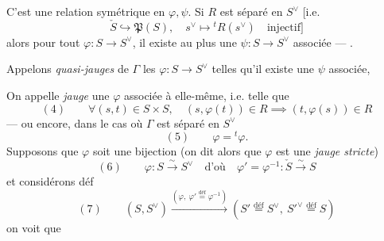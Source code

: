 \documentclass[11pt,a4paper]{article}
\begin{document}
C'est une relation symétrique en $\varphi, \psi$. Si $R$ est séparé en $S^{\vee}$ [i.e.
\[
\check{S} \hookrightarrow \mathfrak{P}(S), \quad s^{\vee} \mapsto {}^{t}R(s^{\vee}) \quad \text{injectif]}
\]
alors pour tout $\varphi : S \to S^{\vee}$, il existe au plus une $\psi : S \to S^{\vee}$ associée ---  \add{\ill{}}.

Appelons \emph{quasi-jauges} de $\Gamma$ les $\varphi : S \to S^{\vee}$ telles qu'il existe une $\psi$ associée,

On appelle \emph{jauge} une $\varphi$ associée à elle-même, i.e. telle que
\[
(4) \qquad \forall (s,t) \in S \times S, \quad (s, \varphi(t)) \in R \implies (t, \varphi(s)) \in R
\]
--- ou encore, dans le cas où $\Gamma$ est séparé en $S^{\vee}$
\[
(5) \qquad \varphi = {}^{t}\varphi .
\]
Supposons que  $\varphi$ soit une bijection (on dit alors que $\varphi$ est une \emph{jauge stricte})
\[
(6) \qquad \varphi : S \xrightarrow{\sim} S^{\vee} \quad \text{d'où} \quad \varphi' = \varphi^{-1} : \check{S} \xrightarrow{\sim} S
\]
et considérons   déf
\[
(7) \qquad (S, S^{\vee}) \xrightarrow{(\varphi,\ \varphi' \overset{\mathrm{déf}}{=} \varphi^{-1})} (S' \overset{\mathrm{déf}}{=} S^{\vee},\ S'^{\vee} \overset{\mathrm{déf}}{=} S)
\]
on voit que 
\end{document}
